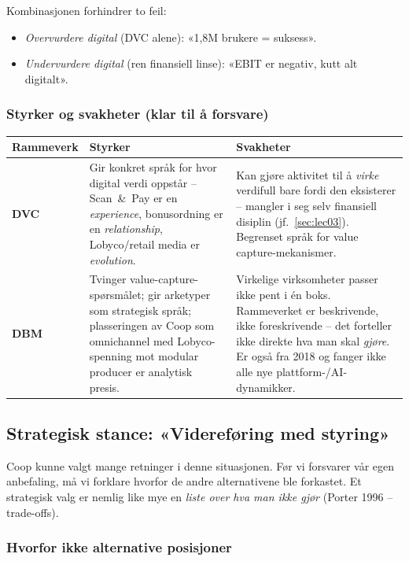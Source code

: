 Kombinasjonen forhindrer to feil:
\begin{itemize}
  \item \emph{Overvurdere digital} (DVC alene): «1,8M brukere = suksess».
  \item \emph{Undervurdere digital} (ren finansiell linse): «EBIT er
    negativ, kutt alt digitalt».
\end{itemize}

\subsubsection*{Styrker og svakheter (klar til å forsvare)}

\begin{tabular}{p{2cm}p{6cm}p{6cm}}
\hline
\textbf{Rammeverk} & \textbf{Styrker} & \textbf{Svakheter} \\
\hline
\textbf{DVC} &
Gir konkret språk for hvor digital verdi oppstår -- Scan~\&~Pay er en
\emph{experience}, bonusordning er en \emph{relationship},
Lobyco/retail media er \emph{evolution}. &
Kan gjøre aktivitet til å \emph{virke} verdifull bare fordi den
eksisterer -- mangler i seg selv finansiell disiplin
(jf.\ \autoref{sec:lec03}). Begrenset språk for
value capture-mekanismer. \\
\hline
\textbf{DBM} &
Tvinger value-capture-spørsmålet; gir arketyper som strategisk språk;
plasseringen av Coop som omnichannel med Lobyco-spenning mot modular
producer er analytisk presis. &
Virkelige virksomheter passer ikke pent i én boks. Rammeverket er
beskrivende, ikke foreskrivende -- det forteller ikke direkte hva man
skal \emph{gjøre}. Er også fra 2018 og fanger ikke alle nye
plattform-/AI-dynamikker. \\
\hline
\end{tabular}

\subsection{Strategisk stance: «Videreføring med styring»}

Coop kunne valgt mange retninger i denne situasjonen. Før vi forsvarer
vår egen anbefaling, må vi forklare hvorfor de andre alternativene ble
forkastet. Et strategisk valg er nemlig like mye en \emph{liste over hva
man ikke gjør} (Porter 1996 -- trade-offs).

\subsubsection*{Hvorfor ikke alternative posisjoner}

